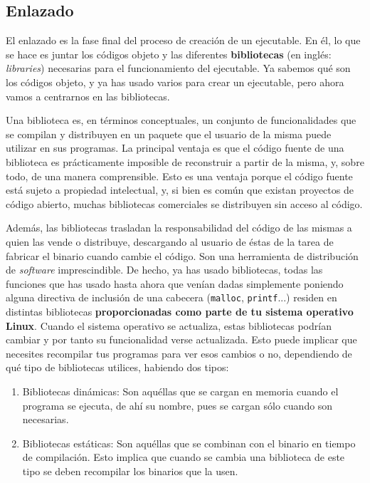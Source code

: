 \documentclass[a4paper]{article}
\begin{document}
\subsection{Enlazado}
El enlazado es la fase final del proceso de creación de un ejecutable. En él,
lo que se hace es juntar los códigos objeto y las diferentes
\textbf{bibliotecas} (en inglés: \textit{libraries})
necesarias para el funcionamiento del ejecutable. Ya
sabemos qué son los códigos objeto, y ya has usado varios para crear un
ejecutable, pero ahora vamos a centrarnos en las bibliotecas.

Una biblioteca es, en términos conceptuales, un conjunto de funcionalidades que
se compilan y distribuyen en un paquete que el usuario de la misma puede
utilizar en sus programas. La principal ventaja es que el código fuente de una
biblioteca es prácticamente imposible de reconstruir a partir de la misma, y,
sobre todo, de una manera comprensible. Esto es una ventaja porque el código
fuente está sujeto a propiedad intelectual, y, si bien es común que existan
proyectos de código abierto, muchas bibliotecas comerciales se distribuyen sin
acceso al código.

Además, las bibliotecas trasladan la responsabilidad del código de las mismas
a quien las vende o distribuye, descargando al usuario de éstas de la tarea
de fabricar
el binario cuando cambie el código. Son una herramienta de distribución de
\emph{software} imprescindible. De hecho, ya has usado bibliotecas, todas las
funciones que has usado hasta ahora que venían dadas simplemente poniendo
alguna directiva de inclusión de una cabecera (\verb!malloc!, \verb!printf!...)
residen en distintas bibliotecas \textbf{proporcionadas como parte de tu
sistema operativo Linux}. Cuando el sistema operativo se actualiza, estas
bibliotecas podrían cambiar y por tanto su funcionalidad verse actualizada.
Esto puede implicar que necesites recompilar tus programas para ver esos cambios
o no, dependiendo de qué tipo de bibliotecas utilices, habiendo dos tipos:

\begin{enumerate}
\item Bibliotecas dinámicas: Son aquéllas que se cargan en memoria cuando el
programa se ejecuta, de ahí su nombre, pues se cargan sólo cuando son
necesarias.
\item Bibliotecas estáticas: Son aquéllas que se combinan con el binario en
tiempo de compilación. Esto implica que cuando se cambia una biblioteca de este
tipo se deben recompilar los binarios que la usen.
\end{enumerate}
\end{document}
